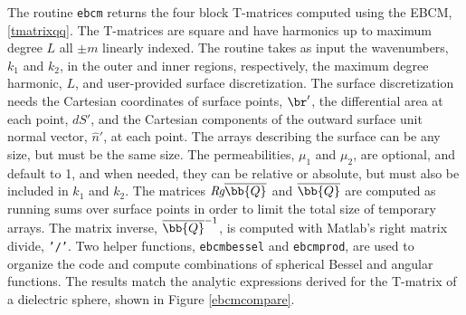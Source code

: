 The routine \texttt{ebcm} returns the four block T-matrices computed using the EBCM, \eqref{tmatrixqq}. The T-matrices are square and have harmonics up to maximum degree $L$ all $\pm m$ linearly indexed. The routine takes as input the wavenumbers, $k_1$ and $k_2$, in the outer and inner regions, respectively, the maximum degree harmonic, $L$, and user-provided surface discretization. The surface discretization needs the Cartesian coordinates of surface points, $\br'$, the differential area at each point, $dS'$, and the Cartesian components of the outward surface unit normal vector, $\hat{n}'$, at each point. The arrays describing the surface can be any size, but must be the same size. The permeabilities, $\mu_1$ and $\mu_2$, are optional, and default to 1, and when needed, they can be relative or absolute, but must also be included in $k_1$ and $k_2$. The matrices $\textit{Rg}\overline{\bb{Q}}$ and $\overline{\bb{Q}}$ are computed as running sums over surface points in order to limit the total size of temporary arrays. The matrix inverse, $\overline{\bb{Q}}^{-1}$, is computed with Matlab's right matrix divide, \texttt{'/'}.  Two helper functions, \texttt{ebcmbessel} and \texttt{ebcmprod}, are used to organize the code and compute combinations of spherical Bessel and angular functions. The results match the analytic expressions derived for the T-matrix of a dielectric sphere, shown in Figure \ref{ebcmcompare}. 


{\footnotesize
{}
}


